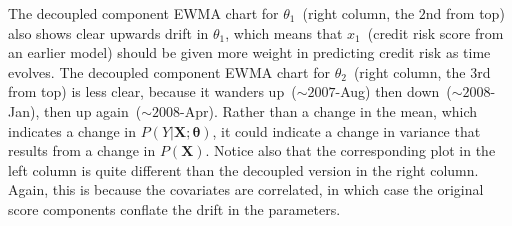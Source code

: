 \documentclass[twoside,11pt]{article}
\begin{document}
The decoupled component EWMA chart for $\theta_1$~(right column, the $2$nd from top) also shows clear upwards drift in $\theta_1$, which means that $x_1$~(credit risk score from an earlier model) should be given more weight in predicting credit risk as time evolves. The decoupled component EWMA chart for $\theta_2$~(right column, the $3$rd from top) is less clear, because it wanders up~($\sim 2007$-Aug) then down~($\sim 2008$-Jan), then up again~($\sim 2008$-Apr). Rather than a change in the mean, which indicates a change in $P(Y|\bm{X};\bm{\theta})$, it could indicate a change in variance that results from a change in $P(\bm{X})$. Notice also that the corresponding plot in the left column is quite different than the decoupled version in the right column. Again, this is because the covariates are correlated, in which case the original score components conflate the drift in the parameters.  
\end{document}

